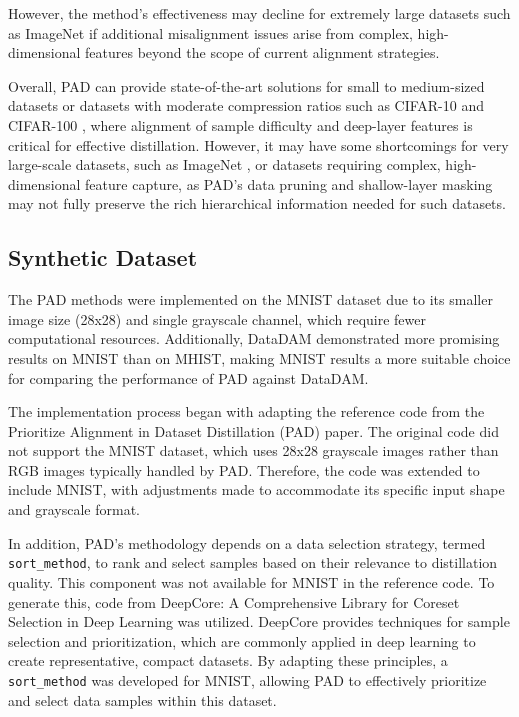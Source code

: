 \documentclass[conference, compsoc]{IEEEtran}
\begin{document}
	However, the method's effectiveness may decline for extremely large datasets such as ImageNet \cite{5206848} if additional misalignment issues arise from complex, high-dimensional features beyond the scope of current alignment strategies.
	
	Overall, PAD can provide state-of-the-art solutions for small to medium-sized datasets or datasets with moderate compression ratios such as CIFAR-10 and CIFAR-100 \cite{Krizhevsky2009LearningML}, where alignment of sample difficulty and deep-layer features is critical for effective distillation. However, it may have some shortcomings for very large-scale datasets, such as ImageNet \cite{5206848}, or datasets requiring complex, high-dimensional feature capture, as PAD's data pruning and shallow-layer masking may not fully preserve the rich hierarchical information needed for such datasets.
	
	\subsection{Synthetic Dataset}
	
	The PAD methods were implemented on the MNIST dataset due to its smaller image size (28x28) and single grayscale channel, which require fewer computational resources. Additionally, DataDAM demonstrated more promising results on MNIST than on MHIST, making MNIST results a more suitable choice for comparing the performance of PAD against DataDAM.
	
	The implementation process began with adapting the reference code from the Prioritize Alignment in Dataset Distillation (PAD) \cite{li2024prioritizealignmentdatasetdistillation} paper. The original code did not support the MNIST dataset, which uses 28x28 grayscale images rather than RGB images typically handled by PAD. Therefore, the code was extended to include MNIST, with adjustments made to accommodate its specific input shape and grayscale format.
	
	In addition, PAD’s methodology depends on a data selection strategy, termed \texttt{sort\_method}, to rank and select samples based on their relevance to distillation quality. This component was not available for MNIST in the reference code. To generate this, code from DeepCore: A Comprehensive Library for Coreset Selection in Deep Learning \cite{guo2022deepcorecomprehensivelibrarycoreset} was utilized. DeepCore provides techniques for sample selection and prioritization, which are commonly applied in deep learning to create representative, compact datasets. By adapting these principles, a \texttt{sort\_method} was developed for MNIST, allowing PAD to effectively prioritize and select data samples within this dataset.
	
\end{document}

